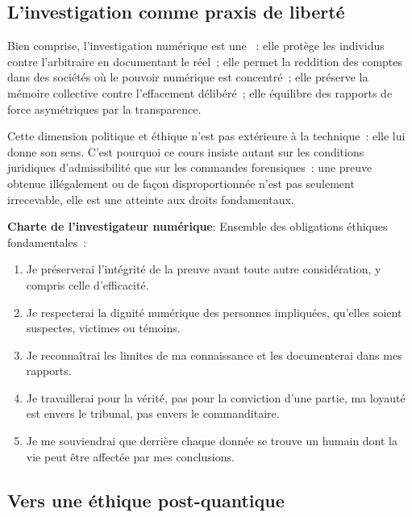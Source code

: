 \subsection{L'investigation comme praxis de liberté}

Bien comprise, l'investigation numérique est une ~: elle protège les individus contre
l'arbitraire en documentant le réel~; elle permet la reddition des comptes
dans des sociétés où le pouvoir numérique est concentré~; elle préserve
la mémoire collective contre l'effacement délibéré~; elle équilibre des
rapports de force asymétriques par la transparence.

\medskip

Cette dimension politique et éthique n'est pas extérieure à la technique~:
elle lui donne son sens. C'est pourquoi ce cours insiste autant sur les
conditions juridiques d'admissibilité que sur les commandes forensiques~:
une preuve obtenue illégalement ou de façon disproportionnée n'est pas
seulement irrecevable, elle est une atteinte aux droits fondamentaux.

\begin{boxdef}
\textbf{Charte de l'investigateur numérique}: Ensemble des obligations éthiques fondamentales~:

\begin{enumerate}
    \item Je préserverai l'intégrité de la preuve avant toute autre
          considération, y compris celle d'efficacité.
    \item Je respecterai la dignité numérique des personnes impliquées,
          qu'elles soient suspectes, victimes ou témoins.
    \item Je reconnaîtrai les limites de ma connaissance et les documenterai
          dans mes rapports.
    \item Je travaillerai pour la vérité, pas pour la conviction d'une
          partie, ma loyauté est envers le tribunal, pas envers
          le commanditaire.
    \item Je me souviendrai que derrière chaque donnée se trouve un humain
          dont la vie peut être affectée par mes conclusions.
\end{enumerate}
\end{boxdef}

\subsection{Vers une éthique post-quantique}

